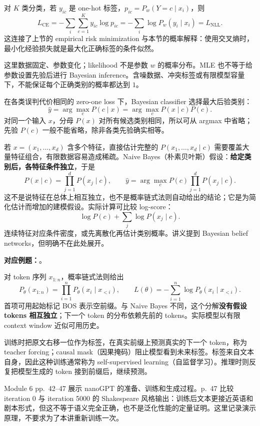 对 $K$ 类分类，若 $y_{ic}$ 是 one-hot 标签，$p_{ic}=P_w(Y=c\mid x_i)$，则
\[
  L_{\mathrm{CE}}=-\sum_i\sum_{c=1}^{K}y_{ic}\log p_{ic}
  =-\sum_i\log P_w(y_i\mid x_i)=L_{\mathrm{NLL}}.
\]
这连接了上节的 empirical risk minimization 与本节的概率解释：使用交叉熵时，最小化经验损失就是最大化正确标签的条件似然。

这里数据固定、参数变化；likelihood 不是参数 $w$ 的概率分布。MLE 也不等于给参数设置先验后进行 Bayesian inference。含噪数据、冲突标签或有限模型容量下，不能保证每个正确类别的概率都达到 $1$。


在各类误判代价相同的 zero-one loss 下，Bayesian classifier 选择最大后验类别：
\[
  \hat y=\arg\max_cP(c\mid x)
  =\arg\max_cP(x\mid c)P(c).
\]
对同一个输入 $x$，分母 $P(x)$ 对所有候选类别相同，所以可从 argmax 中省略；先验 $P(c)$ 一般不能省略，除非各类先验确实相等。

若 $x=(x_1,\ldots,x_d)$ 含多个特征，直接估计完整的 $P(x_1,\ldots,x_d\mid c)$ 需要覆盖大量特征组合，有限数据容易造成稀疏。Naive Bayes（朴素贝叶斯）假设：\textbf{给定类别后，各特征条件独立}，于是
\[
  P(x\mid c)=\prod_{j=1}^{d}P(x_j\mid c),\qquad
  \boxed{\hat y=\arg\max_cP(c)\prod_{j=1}^{d}P(x_j\mid c)}.
\]
这不是说特征在总体上相互独立，也不是概率链式法则自动给出的结论；它是为简化估计而增加的建模假设。实际计算可比较 log-score：
\[
  \log P(c)+\sum_j\log P(x_j\mid c).
\]
连续特征对应条件密度，或先离散化再估计类别概率。讲义提到 Bayesian belief networks，但明确不在此处展开。

\textbf{对应例题：}。


对 token 序列 $x_{1:n}$，概率链式法则给出
\[
  P_\theta(x_{1:n})=\prod_{i=1}^{n}P_\theta(x_i\mid x_{<i}),
  \qquad
  L(\theta)=-\sum_{i=1}^{n}\log P_\theta(x_i\mid x_{<i}).
\]
首项可用起始标记 BOS 表示空前缀。与 Naive Bayes 不同，这个分解\textbf{没有假设 tokens 相互独立}；下一个 token 的分布依赖先前的 tokens。实际模型以有限 context window 近似可用历史。

训练时把原文右移一位作为标签，在真实前缀上预测真实的下一个 token，称为 teacher forcing；causal mask（因果掩码）阻止模型看到未来标签。标签来自文本自身，因此这种训练通常称为 self-supervised learning（自监督学习）。推理时则反复把模型生成的 token 接到前缀后，继续预测。

Module 6 pp.~42--47 展示 nanoGPT 的准备、训练和生成过程。p.~47 比较 iteration 0 与 iteration 5000 的 Shakespeare 风格输出：训练后文本更接近英语和剧本形式，但这不等于语义完全正确，也不是泛化性能的定量证明。这里记录演示原理，不要求为了本讲重新训练一次。

